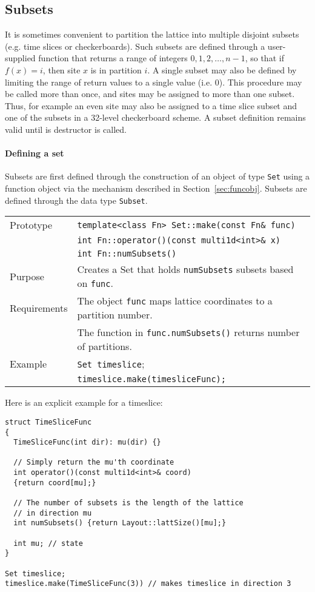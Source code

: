 \documentclass[12pt,letterpaper]{article}
\begin{document}
\subsection{Subsets}

It is sometimes convenient to partition the lattice into multiple
disjoint subsets (e.g. time slices or checkerboards).  Such subsets
are defined through a user-supplied function that returns a range of
integers $0,1,2,\ldots{},n-1$, so that if $f(x) = i$, then site $x$ is
in partition $i$.  A single subset may also be defined by limiting the
range of return values to a single value (i.e. 0).  This procedure may
be called more than once, and sites may be assigned to more than one
subset.  Thus, for example an even site may also be assigned to a time
slice subset and one of the subsets in a 32-level checkerboard scheme.
A subset definition remains valid until is destructor is called.

\paragraph{Defining a set}

Subsets are first defined through the construction of an object
of type \verb|Set| using a function object via the mechanism described
in Section~\ref{sec:funcobj}. Subsets are defined through the 
data type \verb|Subset|.

\begin{flushleft}
  \begin{tabular}{|l|l|}
  \hline
  Prototype    & \verb|template<class Fn> Set::make(const Fn& func)|\\
               & \verb|int Fn::operator()(const multi1d<int>& x)|\\
               & \verb|int Fn::numSubsets()|\\
  \hline
  Purpose      & Creates a Set that holds \verb|numSubsets| subsets based on \verb|func|.\\
  \hline
  Requirements & The object \verb|func| maps lattice coordinates to a partition number.\\
               & The function in \verb|func.numSubsets()| returns number of partitions.\\
  \hline
Example  & \verb|Set timeslice|; \\
         & \verb|timeslice.make(timesliceFunc);| \\
   \hline
  \end{tabular}
\end{flushleft}
%
Here is an explicit example for a timeslice:
%
\begin{verbatim}
struct TimeSliceFunc
{
  TimeSliceFunc(int dir): mu(dir) {}

  // Simply return the mu'th coordinate
  int operator()(const multi1d<int>& coord)
  {return coord[mu];}

  // The number of subsets is the length of the lattice
  // in direction mu
  int numSubsets() {return Layout::lattSize()[mu];}

  int mu; // state
}

Set timeslice;
timeslice.make(TimeSliceFunc(3)) // makes timeslice in direction 3
\end{verbatim}
\end{document}
